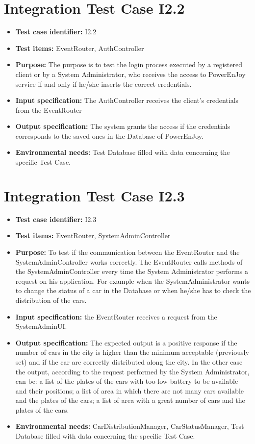 \section{Integration Test Case I2.2}
\begin{itemize}
\item \textbf{Test case identifier:} I2.2
\item \textbf{Test items:} EventRouter, AuthController
\item \textbf{Purpose:} The purpose is to test the login process executed by a registered client or by a System Administrator, who receives the access to PowerEnJoy service if and only if he/she inserts the correct credentials.
\item \textbf{Input specification:} The AuthController receives the client’s credentials from the EventRouter
\item \textbf{Output specification:} The system grants the access if the credentials corresponds to the saved ones in the Database of PowerEnJoy.
\item \textbf{Environmental needs:} Test Database filled with data concerning the specific Test Case.
\end{itemize}

\section{Integration Test Case I2.3}
\begin{itemize}
\item \textbf{Test case identifier:} I2.3
\item \textbf{Test items:} EventRouter, SystemAdminController
\item \textbf{Purpose:} To test if the communication between the EventRouter and the SystemAdminController works correctly. The EventRouter calls methods of the SystemAdminController every time the System Administrator performs a request on his application. For example when the SystemAdministrator wants to change the status of a car in the Database or when he/she has to check the distribution of the cars.
\item \textbf{Input specification:} the EventRouter receives a request from the SystemAdminUI.
\item \textbf{Output specification:} The expected output is a positive response if the number of cars in the city is higher than the minimum acceptable (previously set) and if the car are correctly distributed along the city. In the other case the output, according to the request performed by the System Administrator, can be: a list of the plates of the cars with too low battery to be available and their positions; a list of area in which there are not many cars available and the plates of the cars; a list of area with a great number of cars and the plates of the cars.
\item \textbf{Environmental needs:} CarDistributionManager, CarStatusManager, Test Database filled with data concerning the specific Test Case.
\end{itemize}

